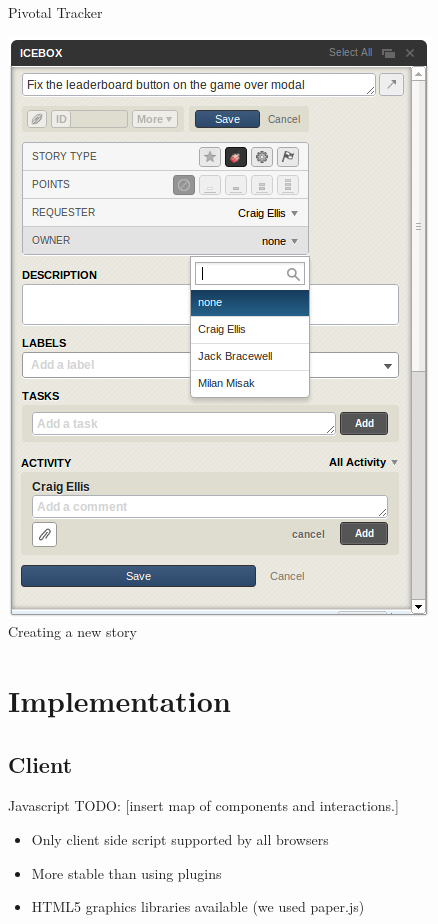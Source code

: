 \documentclass{beamer}
\begin{document}
\begin{frame}{Pivotal Tracker}
  \begin{center}
    \includegraphics[scale=0.32]{pivotal_new_story.png} \\
    Creating a new story
  \end{center}
\end{frame}


\section{Implementation}
\subsection{Client}

\begin{frame}{Javascript}
  TODO:
  [insert map of components and interactions.]
  \begin{itemize}
    \item Only client side script supported by all browsers
    \item More stable than using plugins
    \item HTML5 graphics libraries available (we used paper.js)
  \end{itemize}
\end{frame}
\end{document}
